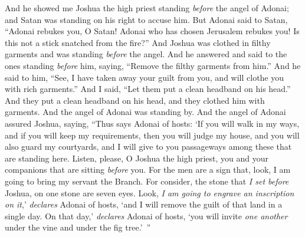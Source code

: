 \begin{biblechapter} %
 And he showed me Joshua the high priest standing \textit{before} the angel of Adonai; and Satan was standing on his right to accuse him.
\verse But Adonai said to Satan, “Adonai rebukes you, O Satan! Adonai who has chosen Jerusalem rebukes you! Is this not a stick snatched from the fire?”
\verse And Joshua was clothed in filthy garments and was standing \textit{before} the angel.
\verse And he answered and said to the ones standing \textit{before} him, saying, “Remove the filthy garments from him.” And he said to him, “See, I have taken away your guilt from you, and will clothe you with rich garments.”
\verse And I said, “Let them put a clean headband on his head.” And they put a clean headband on his head, and they clothed him with garments. And the angel of Adonai was standing by.
\verse And the angel of Adonai assured Joshua, saying,
\verse “Thus says Adonai of hosts: ‘If you will walk in my ways, and if you will keep my requirements, then you will judge my house, and you will also guard my courtyards, and I will give to you passageways among these that are standing here.
\verse Listen, please, O Joshua the high priest, you and your companions that are sitting \textit{before} you. For the men are a sign that, look, I am going to bring my servant the Branch.
\verse For consider, the stone that \textit{I set before} Joshua, on one stone are seven eyes. Look, \textit{I am going to engrave an inscription on it},’ \textit{declares} Adonai of hosts, ‘and I will remove the guilt of that land in a single day.
\verse On that day,’ \textit{declares} Adonai of hosts, ‘you will invite \textit{one another} under the vine and under the fig tree.’ ”
\end{biblechapter}

